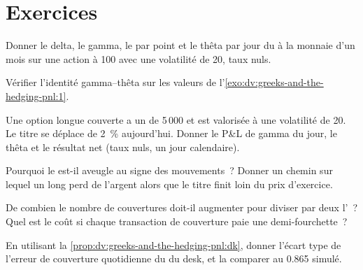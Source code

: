 \section{Exercices}

\begin{exercise}[$\star$]\label{exo:dv:greeks-and-the-hedging-pnl:1}
Donner le delta, le gamma, le  par point et le thêta par jour du  à la monnaie
d'un mois sur une action à 100 avec une volatilité de 20, taux nuls.
\end{exercise}

\begin{exercise}[$\star$]\label{exo:dv:greeks-and-the-hedging-pnl:2}
Vérifier l'identité gamma--thêta sur les valeurs de l'\cref{exo:dv:greeks-and-the-hedging-pnl:1}.
\end{exercise}

\begin{exercise}[$\star$]\label{exo:dv:greeks-and-the-hedging-pnl:3}
Une option longue couverte a un  de 5\,000 et est valorisée à une volatilité de 20.
Le titre se déplace de 2~\% aujourd'hui. Donner le P\&L de gamma du jour, le thêta et le résultat net
(taux nuls, un jour calendaire).
\end{exercise}

\begin{exercise}[$\star\star$]\label{exo:dv:greeks-and-the-hedging-pnl:4}
Pourquoi le  est-il aveugle au signe des mouvements~? Donner un chemin sur lequel
un  long perd de l'argent alors que le titre finit loin du prix d'exercice.
\end{exercise}

\begin{exercise}[$\star\star$]\label{exo:dv:greeks-and-the-hedging-pnl:5}
De combien le nombre de couvertures doit-il augmenter pour diviser par deux l'~?
Quel est le coût si chaque transaction de couverture paie une demi-fourchette~?
\end{exercise}

\begin{exercise}[$\star\star$]\label{exo:dv:greeks-and-the-hedging-pnl:6}
En utilisant la \cref{prop:dv:greeks-and-the-hedging-pnl:dk}, donner l'écart type de
l'erreur de couverture quotidienne du  du desk, et la comparer
au 0.865 simulé.
\end{exercise}

